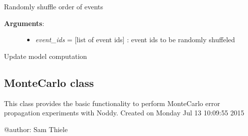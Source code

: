 \documentclass[a4paper,10pt,english]{sphinxmanual}
\begin{document}
\begin{fulllineitems}
\begin{fulllineitems}
\label{pynoddy:pynoddy.experiment.Experiment.shuffle_event_order}
Randomly shuffle order of events
\begin{description}
\item[{\textbf{Arguments}:}] \leavevmode\begin{itemize}
\item {} 
\emph{event\_ids} = {[}list of event ids{]} : event ids to be randomly shuffeled

\end{itemize}

\end{description}

\end{fulllineitems}


\begin{fulllineitems}
\label{pynoddy:pynoddy.experiment.Experiment.update}
Update model computation

\end{fulllineitems}


\begin{fulllineitems}
\label{pynoddy:pynoddy.experiment.Experiment.write_parameter_changes}
\end{fulllineitems}


\end{fulllineitems}



\subsection{MonteCarlo class}
\label{pynoddy:montecarlo-class}
This class provides the basic functionality to perform MonteCarlo error propagation
experiments with Noddy.
\label{pynoddy:module-pynoddy.experiment.MonteCarlo}
Created on Monday Jul 13 10:09:55 2015

@author: Sam Thiele
\end{document}
